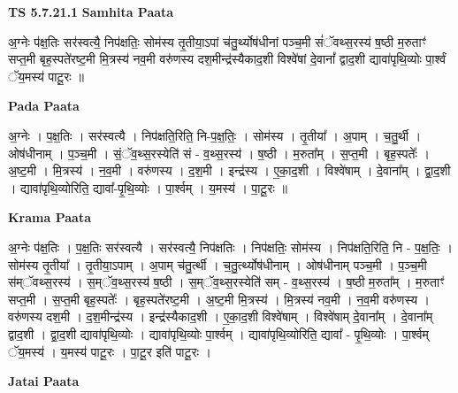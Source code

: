 \documentclass[17pt]{extarticle}
\begin{document}
\textbf{TS 5.7.21.1 } \newline
\textbf{Samhita Paata} \newline

अ॒ग्नेः प॑क्ष॒तिः सर॑स्वत्यै॒ निप॑क्षतिः॒ सोम॑स्य तृ॒तीया॒ऽपां च॑तु॒र्थ्योष॑धीनां पञ्च॒मी सं॑ॅवथ्स॒रस्य॑ ष॒ष्ठी म॒रुताꣳ॑ सप्त॒मी बृह॒स्पते॑रष्ट॒मी मि॒त्रस्य॑ नव॒मी वरु॑णस्य दश॒मीन्द्र॑स्यैकाद॒शी विश्वे॑षां दे॒वानां᳚ द्वाद॒शी द्यावा॑पृथि॒व्योः पा॒र्श्वं ॅय॒मस्य॑ पाटू॒रः ॥ \newline

\textbf{Pada Paata} \newline

अ॒ग्नेः । प॒क्ष॒तिः । सर॑स्वत्यै । निप॑क्षति॒रिति॒ नि-प॒क्ष॒तिः॒ । सोम॑स्य । तृ॒तीया᳚ । अ॒पाम् । च॒तु॒र्थी । ओष॑धीनाम् । प॒ञ्च॒मी । सं॒ॅव॒थ्स॒रस्येति॑ सं - व॒थ्स॒रस्य॑ । ष॒ष्ठी । म॒रुता᳚म् । स॒प्त॒मी । बृह॒स्पतेः᳚ । अ॒ष्ट॒मी । मि॒त्रस्य॑ । न॒व॒मी । वरु॑णस्य । द॒श॒मी । इन्द्र॑स्य । ए॒का॒द॒शी । विश्वे॑षाम् । दे॒वाना᳚म् । द्वा॒द॒शी । द्यावा॑पृथि॒व्योरिति॒ द्यावा᳚-पृ॒थि॒व्योः । पा॒र्श्वम् । य॒मस्य॑ । पा॒टू॒रः ॥  \newline


\textbf{Krama Paata} \newline

अ॒ग्नेः प॑क्ष॒तिः । प॒क्ष॒तिः सर॑स्वत्यै । सर॑स्वत्यै॒ निप॑क्षतिः । निप॑क्षतिः॒ सोम॑स्य । निप॑क्षति॒रिति॒ नि - प॒क्ष॒तिः॒ । सोम॑स्य तृ॒तीया᳚ । तृ॒तीया॒ऽपाम् । अ॒पाम् च॑तु॒र्त्थी । च॒तु॒र्त्थ्योष॑धीनाम् । ओष॑धीनाम् पञ्च॒मी । प॒ञ्च॒मी स॑म्ॅवथ्स॒रस्य॑ । स॒म्ॅव॒थ्स॒रस्य॑ ष॒ष्ठी । स॒म्ॅव॒थ्स॒रस्येति॑ सम् - व॒थ्स॒रस्य॑ । ष॒ष्ठी म॒रुता᳚म् । म॒रुताꣳ॑ सप्त॒मी । स॒प्त॒मी बृह॒स्पतेः᳚ । बृह॒स्पते॑रष्ट॒मी । अ॒ष्ट॒मी मि॒त्रस्य॑ । मि॒त्रस्य॑ नव॒मी । न॒व॒मी वरु॑णस्य । वरु॑णस्य दश॒मी । द॒श॒मीन्द्र॑स्य । इन्द्र॑स्यैकाद॒शी । ए॒का॒द॒शी विश्वे॑षाम् । विश्वे॑षाम् दे॒वाना᳚म् । दे॒वाना᳚म् द्वाद॒शी । द्वा॒द॒शी द्यावा॑पृथि॒व्योः । द्यावा॑पृथि॒व्योः पा॒र्श्वम् । द्यावा॑पृथि॒व्योरिति॒ द्यावा᳚ - पृ॒थि॒व्योः । पा॒र्श्वम् ॅय॒मस्य॑ । य॒मस्य॑ पाटू॒रः । पा॒टू॒र इति॑ पाटू॒रः । \newline

\textbf{Jatai Paata} \newline
\end{document}
